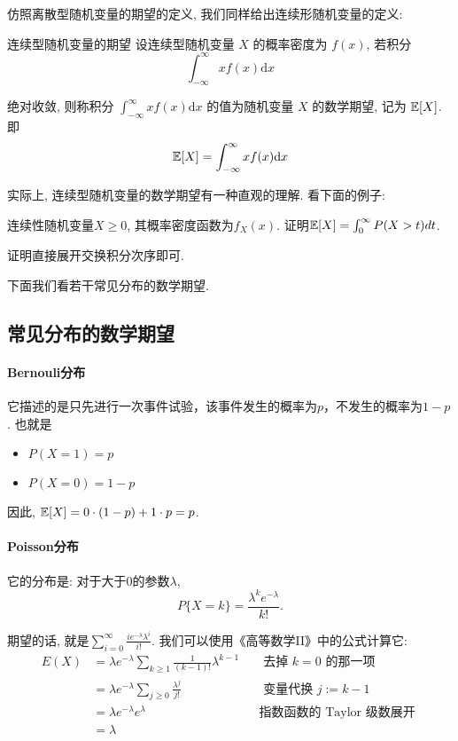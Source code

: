     
    仿照离散型随机变量的期望的定义, 我们同样给出连续形随机变量的定义:
    \begin{definition}{连续型随机变量的期望}
        设连续型随机变量 $X$ 的概率密度为 $f(x)$, 若积分
$$
\int_{-\infty}^{\infty} x f(x) \mathrm{d} x
$$

绝对收敛, 则称积分 $\int_{-\infty}^{\infty} x f(x) \mathrm{d} x$ 的值为随机变量 $X$ 的数学期望, 记为 $\mathbb E[X]$.即
$$
\mathbb E[X]=\int_{-\infty}^{\infty} x f(x) \mathrm{d} x
$$
    \end{definition}

    实际上, 连续型随机变量的数学期望有一种直观的理解. 看下面的例子: 
    \begin{example}
        连续性随机变量$X\geq 0$, 其概率密度函数为$f_X(x)$. 证明$\mathbb E[X]=\int_0^\infty P(X>t) dt$. 
    \end{example}

    证明直接展开交换积分次序即可. 
    
    下面我们看若干常见分布的数学期望. 

    \subsection{常见分布的数学期望}

    \paragraph{Bernouli分布} 它描述的是只先进行一次事件试验，该事件发生的概率为$p$，不发生的概率为$1-p$. 也就是
    \begin{itemize}
        \item $P(X=1)=p$
        \item $P(X=0)=1-p$
    \end{itemize}

    因此, $ \mathbb E[X]=0 \cdot(1-p)+1 \cdot p=p$.

    \paragraph{Poisson分布} 它的分布是: 对于大于0的参数$\lambda$, $$
    P\{X=k\}=\frac{\lambda^k e^{-\lambda}}{k !}. 
    $$    

    期望的话, 就是$\sum_{i=0}^{\infty} \frac{i e^{-\lambda} \lambda^i}{i !}$. 我们可以使用《高等数学II》中的公式计算它: 
    $$
\begin{aligned}
{E}(X) & =\lambda e^{-\lambda} \sum_{k \geq 1} \frac{1}{(k-1) !} \lambda^{k-1} & & \text { 去掉 } k=0 \text { 的那一项 } \\
& =\lambda e^{-\lambda} \sum_{j \geq 0} \frac{\lambda^j}{j !} & & \text { 变量代换 } j:=k-1 \\
& =\lambda e^{-\lambda} e^\lambda & & \text {指数函数的 Taylor 级数展开 } \\
& =\lambda & &
\end{aligned}
$$

